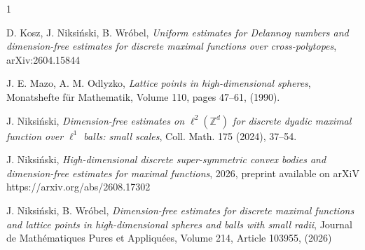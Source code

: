 \documentclass[a4paper,twoside, reqno]{amsart}
\numberwithin{equation}{section}
\theoremstyle{definition}%
\theoremstyle{definition}
\theoremstyle{definition}%
\theoremstyle{definition}
\newcommand{\Z}{\mathbb{Z}}
\begin{document}
\begin{thebibliography}{1}


\normalsize
\baselineskip=17pt


 D. Kosz, J. Niksi\'nski, B. Wr\'obel, \textit{Uniform estimates for Delannoy numbers and dimension-free estimates for discrete maximal functions over cross-polytopes},
  	arXiv:2604.15844

     J. E. Mazo, A. M. Odlyzko, 
\emph{Lattice points in high-dimensional spheres}, 
Monatshefte für Mathematik, Volume 110, pages 47–61, (1990).

J. Niksiński,
\textit{Dimension-free estimates on $\ell^2(\Z^d)$ for discrete dyadic maximal function over $\ell^1$ balls: small scales},
Coll. Math. 175 (2024), 37--54.

  J. Niksi\'nski, \textit{High-dimensional discrete super-symmetric convex bodies and dimension-free estimates for maximal functions}, 2026, preprint available on arXiV
https://arxiv.org/abs/2608.17302

 J. Niksi\'nski, B. Wr\'obel, \textit{Dimension-free estimates for discrete maximal functions and lattice points in high-dimensional spheres and balls with small radii},
  	Journal de Mathématiques Pures et Appliquées, Volume 214, Article 103955, (2026)

\end{thebibliography}
\end{document}
